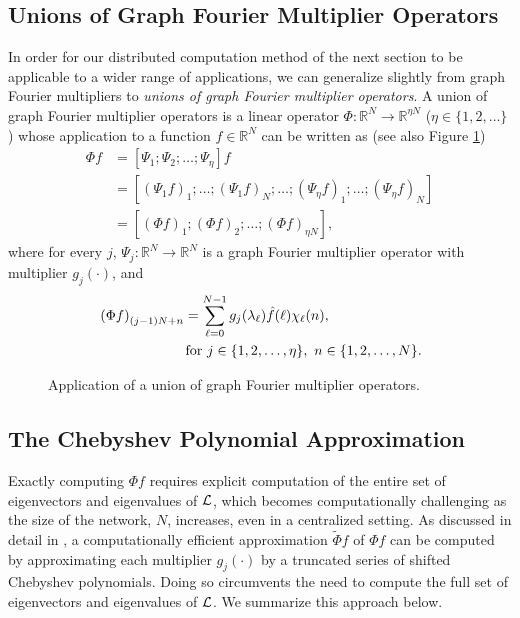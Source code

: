 \documentclass[conference]{IEEEtran}
\renewcommand{\l}{\ell}
\newcommand{\Rbb}{\mathbb{R}}
\renewcommand{\L}{{\mathcal{L}}}
\def\L{{\cal L}}
\begin{document}
\subsection{Unions of Graph Fourier Multiplier Operators}
In order for our distributed computation method of the next section to be applicable to a wider range of applications, we can generalize slightly from graph Fourier multipliers to
\emph{unions of graph Fourier multiplier operators}. A union of graph Fourier multiplier operators is a linear operator
$\Phi: \Rbb^N \rightarrow \Rbb^{\eta N}$ ($\eta \in \{1,2,\ldots\}$) whose application to a function
$f \in \Rbb^N$ can be written as (see also Figure \ref{Fig:union})
\begin{align*}
\Phi f &=
\left[
\Psi_1; \Psi_2; \ldots; \Psi_{\eta}
\right] f \\
&=\left[(\Psi_1 f)_1;\ldots;(\Psi_1 f)_N;\ldots;(\Psi_{\eta} f)_1;\ldots;(\Psi_{\eta} f)_N
\right] \\
&=
 \left[
(\Phi f)_1;
(\Phi f)_2;
\ldots;
(\Phi f)_{\eta N}
\right], \end{align*}
where for every $j$, $\Psi_j: \Rbb^N \rightarrow \Rbb^{N}$ is a graph Fourier multiplier operator with multiplier $g_j(\cdot)$, and
\begin{align} \label{Eq:operator_def}
&\left(\Phi f\right)_{(j-1)N+n} = \sum_{\l=0}^{N-1}g_j(\lambda_{\l}) \hat{f}(\l) \chi_{\l}(n), \\
& \hspace{2.2cm}\hbox{for }j\in\{1,2,\ldots,\eta\},~ n\in\{1,2,\ldots,N\}. \nonumber
\end{align}
\begin{figure}
\caption{Application of a union of graph Fourier multiplier operators.} \label{Fig:union}
\end{figure}


\subsection{The Chebyshev Polynomial Approximation}
Exactly computing $\Phi f$ requires explicit computation of the entire set of eigenvectors and eigenvalues of $\L$, which becomes computationally challenging as the size of the network, $N$, increases, even in a centralized setting. As discussed in detail in \cite[Section 6]{LTS-ARTICLE-2009-053}, a computationally efficient approximation $\tilde{\Phi}f$ of $\Phi f$ can be computed by approximating each multiplier $g_j(\cdot)$ by a truncated series of shifted Chebyshev polynomials. Doing so circumvents the need to compute the full set of eigenvectors and eigenvalues of $\L$. We summarize this approach below.
\end{document}
